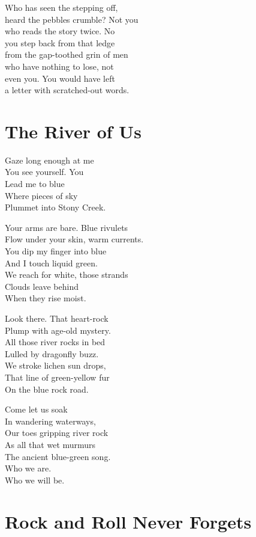 \documentclass[twoside,10pt]{book}
\begin{document}
Who has seen the stepping off,\\
heard the pebbles crumble? Not you\\
who reads the story twice. No\\
you step back from that ledge\\
from the gap-toothed grin of men\\
who have nothing to lose, not\\
even you. You would have left\\
a letter with scratched-out words.


\clearpage
\section{The River of Us}

Gaze long enough at me\\
You see yourself. You\\
Lead me to blue\\
Where pieces of sky\\
Plummet into Stony Creek.

Your arms are bare. Blue rivulets\\
Flow under your skin, warm currents.\\
You dip my finger into blue\\
And I touch liquid green.\\
We reach for white, those strands\\
Clouds leave behind\\
When they rise moist.

Look there. That heart-rock\\
Plump with age-old mystery.\\
All those river rocks in bed\\
Lulled by dragonfly buzz.\\
We stroke lichen sun drops,\\
That line of green-yellow fur\\
On the blue rock road.

Come let us soak\\
In wandering waterways,\\
Our toes gripping river rock\\
As all that wet murmurs\\
The ancient blue-green song.\\
Who we are.\\
Who we will be.


\clearpage
\section{Rock and Roll Never Forgets}
\end{document}
